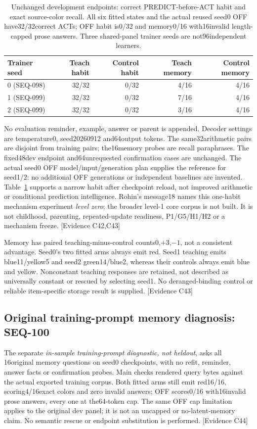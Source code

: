 \documentclass[11pt]{article}
\newcommand{\ev}[1]{\textsf{[Evidence #1]}}
\begin{document}
\begin{table}[htbp]
\centering
\begin{tabular}{lrrrr}
\toprule
Trainer seed & Teach habit & Control habit & Teach memory & Control memory \\
\midrule
0 (SEQ-098) & 32/32 & 0/32 & 4/16 & 4/16 \\
1 (SEQ-099) & 32/32 & 0/32 & 7/16 & 4/16 \\
2 (SEQ-099) & 32/32 & 0/32 & 3/16 & 4/16 \\
\bottomrule
\end{tabular}
\caption{Unchanged development endpoints: correct PREDICT-before-ACT habit
and exact source-color recall. All six fitted states and the actual reused
seed0 OFF have32/32correct ACTs; OFF habit is0/32 and memory0/16 with16invalid
length-capped prose answers. Three shared-panel trainer seeds are not96independent learners.}
\label{tab:fundamental099}
\end{table}

No evaluation reminder, example, answer or parent is appended. Decoder settings
are temperature0, seed20260912 and64output tokens. The same32arithmetic pairs
are disjoint from training pairs; the16memory probes are recall paraphrases.
The fixed48dev endpoint and64unrequested confirmation cases are unchanged.
The actual seed0 OFF model/input/generation plan supplies the reference for
seed1/2: no additional OFF generations or independent baselines are invented.
Table~\ref{tab:fundamental099} supports a narrow habit after checkpoint reload,
not improved arithmetic or conditional prediction intelligence. Rohin's message18
names this one-habit mechanism experiment \emph{level zero}; the broader
level-1 core corpus is not built. It is not childhood, parenting, repeated-update
readiness, P1/G5/H1/H2 or a mechanism freeze. \ev{C42,C43}

Memory has paired teaching-minus-control counts0,$+3$,$-1$, not a consistent
advantage. Seed0's two fitted arms always emit red. Seed1 teaching emits
blue11/yellow5 and seed2 green14/blue2, whereas their controls always emit
blue and yellow. Nonconstant teaching responses are retained, not described
as universally constant or rescued by selecting seed1. No deranged-binding
control or reliable item-specific storage result is supplied. \ev{C43}

\subsection{Original training-prompt memory diagnosis: SEQ-100}
The separate \emph{in-sample training-prompt diagnostic, not heldout}, asks all
16original memory questions on seed0 checkpoints, with no refit, reminder,
answer facts or confirmation probes. Main checks rendered query bytes against
the actual exported training corpus. Both fitted arms still emit red16/16,
scoring4/16exact colors and zero invalid answers; OFF scores0/16 with16invalid
prose answers, every one at the64-token cap. The same OFF cap limitation
applies to the original dev panel; it is not an uncapped or no-latent-memory
claim. No semantic rescue or endpoint substitution is performed. \ev{C44}
\end{document}
